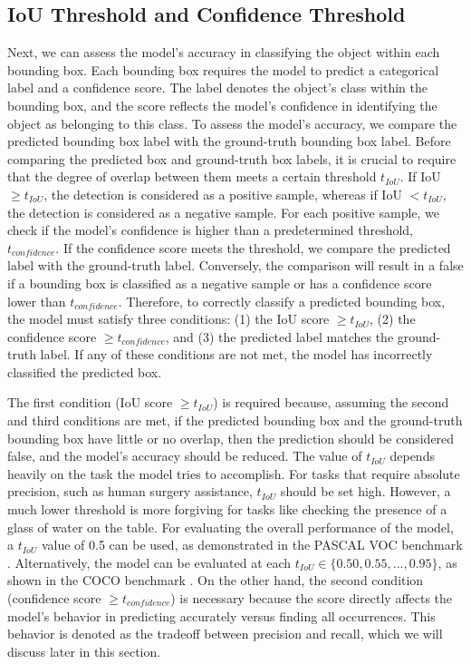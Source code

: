 \subsection{IoU Threshold and Confidence Threshold}  \label{subsec:iou_conf_threshold}
Next, we can assess the model's accuracy in classifying the object within each bounding box. Each bounding box requires the model to predict a categorical label and a confidence score. The label denotes the object's class within the bounding box, and the score reflects the model's confidence in identifying the object as belonging to this class. To assess the model's accuracy, we compare the predicted bounding box label with the ground-truth bounding box label. Before comparing the predicted box and ground-truth box labels, it is crucial to require that the degree of overlap between them meets a certain threshold $t_{IoU}$. If IoU $\geq t_{IoU}$, the detection is considered as a positive sample, whereas if IoU $< t_{IoU}$, the detection is considered as a negative sample. For each positive sample, we check if the model's confidence is higher than a predetermined threshold, $t_{confidence}$. If the confidence score meets the threshold, we compare the predicted label with the ground-truth label. Conversely, the comparison will result in a false if a bounding box is classified as a negative sample or has a confidence score lower than $t_{confidence}$. Therefore, to correctly classify a predicted bounding box, the model must satisfy three conditions: (1) the IoU score $\geq t_{IoU}$, (2) the confidence score $\geq t_{confidence}$, and (3) the predicted label matches the ground-truth label. If any of these conditions are not met, the model has incorrectly classified the predicted box.

The first condition (IoU score $\geq t_{IoU}$) is required because, assuming the second and third conditions are met, if the predicted bounding box and the ground-truth bounding box have little or no overlap, then the prediction should be considered false, and the model's accuracy should be reduced. The value of $t_{IoU}$ depends heavily on the task the model tries to accomplish. For tasks that require absolute precision, such as human surgery assistance, $t_{IoU}$ should be set high. However, a much lower threshold is more forgiving for tasks like checking the presence of a glass of water on the table. For evaluating the overall performance of the model, a $t_{IoU}$ value of 0.5 can be used, as demonstrated in the PASCAL VOC benchmark \cite{pascal_voc_2015}. Alternatively, the model can be evaluated at each $t_{IoU} \in \{0.50, 0.55, ..., 0.95\}$, as shown in the COCO benchmark \cite{coco_2014}. On the other hand, the second condition (confidence score $\geq t_{confidence}$) is necessary because the score directly affects the model's behavior in predicting accurately versus finding all occurrences. This behavior is denoted as the tradeoff between precision and recall, which we will discuss later in this section.

